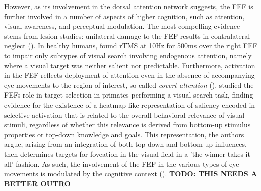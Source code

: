 \documentclass[a4paper, 12pt]{scrreprt}
\begin{document}
However, as its involvement in the dorsal attention network suggests, the FEF is further involved in a number of aspects of higher cognition, such as attention, visual awareness, and perceptual modulation. The most compelling evidence stems from lesion studies: unilateral damage to the FEF results in contralateral neglect (\cite{crowne1981effects}). In healthy humans, \textcite{muggleton2003human} found rTMS at 10Hz for 500ms over the right FEF to impair only subtypes of visual search involving endogenous attention, namely where a visual target was neither salient nor predictable. Furthermore, activation in the FEF reflects deployment of attention even in the absence of accompanying eye movements to the region of interest, so called \textit{covert attention} (\cite{vossel2014dorsal}). \textcite{thompson2005visual} studied the FEFs role in target selection in primates performing a visual search task, finding evidence for the existence of a heatmap-like representation of saliency encoded in selective activation that is related to the overall behavioral relevance of visual stimuli, regardless of whether this relevance is derived from bottom-up stimulus properties or top-down knowledge and goals. This representation, the authors argue, arising from an integration of both top-down and bottom-up influences, then determines targets for foveation in the visual field in a 'the-winner-takes-it-all' fashion. 
As such, the involvement of the FEF in the various types of eye movements is modulated by the cognitive context (\cite{vernet2014corrigendum}). \newline
\textbf{TODO: THIS NEEDS A BETTER OUTRO}
\end{document}
